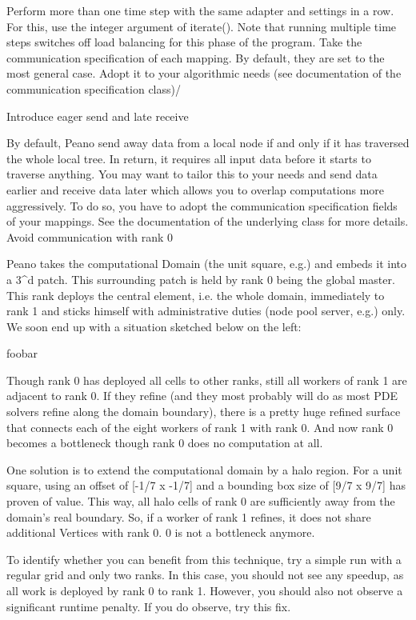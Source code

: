     Perform more than one time step with the same adapter and settings in a row. For this, use the integer argument of iterate(). Note that running multiple time steps switches off load balancing for this phase of the program.
    Take the communication specification of each mapping. By default, they are set to the most general case. Adopt it to your algorithmic needs (see documentation of the communication specification class)/

Introduce eager send and late receive

By default, Peano send away data from a local node if and only if it has traversed the whole local tree. In return, it requires all input data before it starts to traverse anything. You may want to tailor this to your needs and send data earlier and receive data later which allows you to overlap computations more aggressively. To do so, you have to adopt the communication specification fields of your mappings. See the documentation of the underlying class for more details.
Avoid communication with rank 0

Peano takes the computational Domain (the unit square, e.g.) and embeds it into a 3^d patch. This surrounding patch is held by rank 0 being the global master. This rank deploys the central element, i.e. the whole domain, immediately to rank 1 and sticks himself with administrative duties (node pool server, e.g.) only. We soon end up with a situation sketched below on the left:

foobar

Though rank 0 has deployed all cells to other ranks, still all workers of rank 1 are adjacent to rank 0. If they refine (and they most probably will do as most PDE solvers refine along the domain boundary), there is a pretty huge refined surface that connects each of the eight workers of rank 1 with rank 0. And now rank 0 becomes a bottleneck though rank 0 does no computation at all.

One solution is to extend the computational domain by a halo region. For a unit square, using an offset of [-1/7 x -1/7] and a bounding box size of [9/7 x 9/7] has proven of value. This way, all halo cells of rank 0 are sufficiently away from the domain's real boundary. So, if a worker of rank 1 refines, it does not share additional Vertices with rank 0. 0 is not a bottleneck anymore.

To identify whether you can benefit from this technique, try a simple run with a regular grid and only two ranks. In this case, you should not see any speedup, as all work is deployed by rank 0 to rank 1. However, you should also not observe a significant runtime penalty. If you do observe, try this fix.

